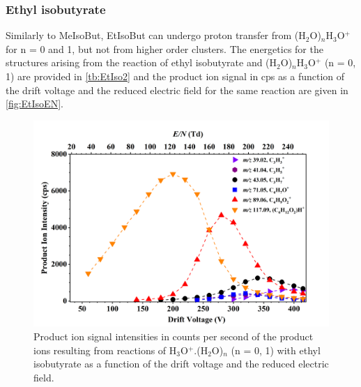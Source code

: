 










\subsubsection{Ethyl isobutyrate}\label{section:EtIsoBut}


Similarly to MeIsoBut, EtIsoBut can undergo proton transfer from (H$_2$O)$_n$H$_3$O$^+$ for n = 0 and 1, but not from higher order clusters.
%
The energetics for the structures arising from the reaction of ethyl isobutyrate and (H$_2$O)$_n$H$_3$O$^+$ (n = 0, 1) are provided in \autoref{tb:EtIso2} and the product ion signal in cps as a function of the drift voltage and the reduced electric field for the same reaction are given in \autoref{fig:EtIsoEN}.



\begin{figure}[htbp]
\centering
\includegraphics[width=0.8\linewidth]{pics/cocaine-chapter/EtIsobyturate-cps.png}
\caption{Product ion signal intensities in counts per second of the product ions resulting from reactions of H$_3$O$^+$.(H$_2$O)$_n$ (n = 0, 1) with ethyl isobutyrate as a function of the drift voltage and the reduced electric field.} 
\label{fig:EtIsoEN}
\end{figure}

